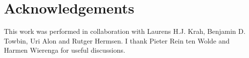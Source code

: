 %


\section{Acknowledgements}

This work was performed in collaboration with Laurens H.J. Krah, Benjamin D. Towbin, Uri Alon and Rutger Hermsen.
%
I thank Pieter Rein ten Wolde and Harmen Wierenga for useful discussions.






